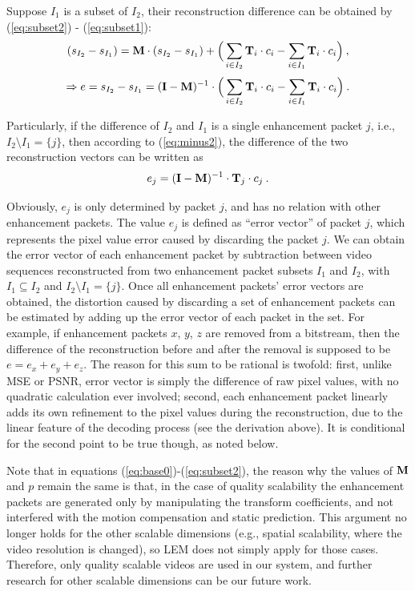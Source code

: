 \documentclass[journal]{IEEEtran}
\begin{document}
Suppose $I_1$ is a subset of $I_2$, their reconstruction difference can be obtained by (\ref{eq:subset2}) - (\ref{eq:subset1}):
\begin{equation}
\label{eq:minus1}
(s_{I_2} - s_{I_1}) = {\rm\bf M} \cdot (s_{I_2} - s_{I_1}) + \Big( \sum_{i \in I_2}{\rm\bf T}_i \cdot c_i - \sum_{i \in I_1}{\rm\bf T}_i \cdot c_i \Big) \: ,
\end{equation}
\begin{equation}
\label{eq:minus2}
\Rightarrow e = s_{I_2} - s_{I_1} = ({\rm\bf I - M})^{-1} \cdot \Big( \sum_{i \in I_2}{\rm\bf T}_i \cdot c_i - \sum_{i \in I_1}{\rm\bf T}_i \cdot c_i \Big) \: .
\end{equation}
	
Particularly, if the difference of $I_2$ and $I_1$ is a single enhancement packet $j$, i.e., $I_2 \setminus I_1 = \{j\}$, then according to (\ref{eq:minus2}), the difference of the two reconstruction vectors can be written as
\begin{equation}
\label{eq:error_j}
e_j = ({\rm\bf I - M})^{-1} \cdot {\rm\bf T}_j \cdot c_j \: .
\end{equation}
	
Obviously, $e_j$ is only determined by packet $j$, and has no relation with other enhancement packets. The value $e_j$ is defined as ``error vector'' of packet $j$, which represents the pixel value error caused by discarding the packet $j$. We can obtain the error vector of each enhancement packet by subtraction between video sequences reconstructed from two enhancement packet subsets $I_1$ and $I_2$, with $I_1 \subseteq I_2$ and $I_2 \setminus I_1 =\{j\} $. Once all enhancement packets' error vectors are obtained, the distortion caused by discarding a set of enhancement packets can be estimated by adding up the error vector of each packet in the set. For example, if enhancement packets $x$, $y$, $z$ are removed from a bitstream, then the difference of the reconstruction before and after the removal is supposed to be $e = e_x + e_y + e_z$. The reason for this sum to be rational is twofold: first, unlike MSE or PSNR, error vector is simply the difference of raw pixel values, with no quadratic calculation ever involved; second, each enhancement packet linearly adds its own refinement to the pixel values during the reconstruction, due to the linear feature of the decoding process (see the derivation above). It is conditional for the second point to be true though, as noted below.

Note that in equations (\ref{eq:base0})-(\ref{eq:subset2}), the reason why the values of ${\rm\bf M}$ and $p$ remain the same is that, in the case of quality scalability the enhancement packets are generated only by manipulating the transform coefficients, and not interfered with the motion compensation and static prediction. This argument no longer holds for the other scalable dimensions (e.g., spatial scalability, where the video resolution is changed), so LEM does not simply apply for those cases. Therefore, only quality scalable videos are used in our system, and further research for other scalable dimensions can be our future work.
\end{document}
